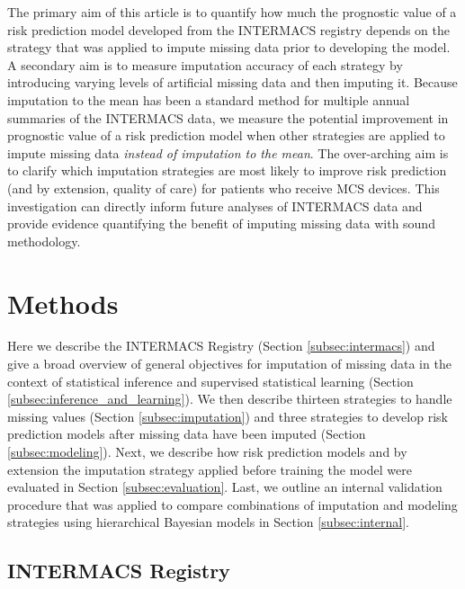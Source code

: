 \documentclass{article}
\begin{document}
The primary aim of this article is to quantify how much the prognostic
value of a risk prediction model developed from the INTERMACS registry
depends on the strategy that was applied to impute missing data prior to
developing the model. A secondary aim is to measure imputation accuracy
of each strategy by introducing varying levels of artificial missing
data and then imputing it. Because imputation to the mean has been a
standard method for multiple annual summaries of the INTERMACS data, we
measure the potential improvement in prognostic value of a risk
prediction model when other strategies are applied to impute missing
data \emph{instead of imputation to the mean}. The over-arching aim is
to clarify which imputation strategies are most likely to improve risk
prediction (and by extension, quality of care) for patients who receive
MCS devices. This investigation can directly inform future analyses of
INTERMACS data and provide evidence quantifying the benefit of imputing
missing data with sound methodology.

\hypertarget{methods}{%
\section{Methods}\label{methods}}

\label{sec:methods}

Here we describe the INTERMACS Registry (Section \ref{subsec:intermacs})
and give a broad overview of general objectives for imputation of
missing data in the context of statistical inference and supervised
statistical learning (Section \ref{subsec:inference_and_learning}). We
then describe thirteen strategies to handle missing values (Section
\ref{subsec:imputation}) and three strategies to develop risk prediction
models after missing data have been imputed (Section
\ref{subsec:modeling}). Next, we describe how risk prediction models and
by extension the imputation strategy applied before training the model
were evaluated in Section \ref{subsec:evaluation}. Last, we outline an
internal validation procedure that was applied to compare combinations
of imputation and modeling strategies using hierarchical Bayesian models
in Section \ref{subsec:internal}.

\hypertarget{intermacs-registry}{%
\subsection{INTERMACS Registry}\label{intermacs-registry}}

\label{subsec:intermacs}
\end{document}
